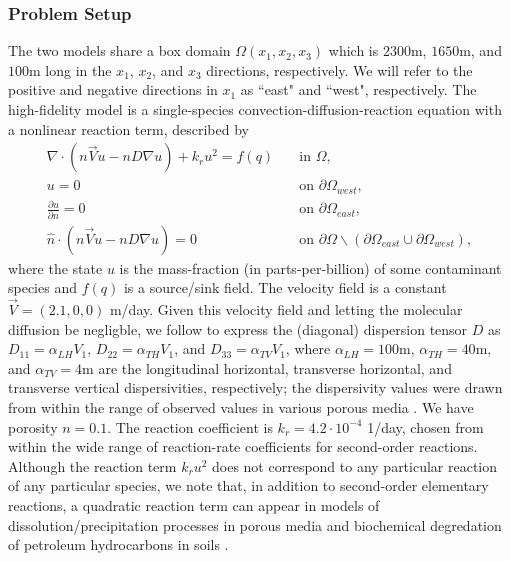 \subsubsection{Problem Setup} \label{sec:setup3D_diffmesh}

The two models share a box domain $\Omega(x_1,x_2,x_3)$ which is $2300$m, $1650$m, and $100$m long in the $x_1$, $x_2$, and $x_3$ directions, respectively. We will refer to the positive and negative directions in $x_1$ as ``east" and ``west", respectively. The high-fidelity model is a single-species convection-diffusion-reaction equation with a nonlinear reaction term, described by
%
\begin{subequations}
\label{eq:cdvcdrHF3D}
\begin{align}
\nabla\cdot(n\vec{V}u - nD\nabla u) + k_ru^2 = f(q) \quad &\text{in } \Omega, \label{eq:HFeq3D}\\
u = 0 \quad &\text{on } \partial \Omega_{west}, \\
\frac{\partial u}{\partial n} = 0 \quad &\text{on }\partial\Omega_{east}, \\
\hat{n}\cdot(n\vec{V}u - nD\nabla u) = 0 \quad &\text{on }\partial\Omega\backslash(\partial\Omega_{east}\cup\partial\Omega_{west}),
\end{align}
\end{subequations}
%
where the state $u$ is the mass-fraction (in parts-per-billion) of some contaminant species and $f(q)$ is a source/sink field. The velocity field is a constant $\vec{V}=(2.1,0,0)$ m/day. Given this velocity field and letting the molecular diffusion be negligble, we follow \cite{Vestedetal93} to express the (diagonal) dispersion tensor $D$ as $D_{11}=\alpha_{LH}V_1$, $D_{22}=\alpha_{TH}V_1$, and $D_{33}=\alpha_{TV}V_1$, where $\alpha_{LH}=100$m, $\alpha_{TH}=40$m, and $\alpha_{TV}=4$m are the longitudinal horizontal, transverse horizontal, and transverse vertical dispersivities, respectively; the dispersivity values were drawn from within the range of observed values in various porous media \cite{Davis86}. We have porosity $n=0.1$. The reaction coefficient is $k_r=4.2\cdot10^{-4}$ 1/day, chosen from within the wide range of reaction-rate coefficients for second-order reactions. Although the reaction term $k_ru^2$ does not correspond to any particular reaction of any particular species, we note that, in addition to second-order elementary reactions, a quadratic reaction term can appear in models of dissolution/precipitation processes in porous media \cite{Aha97} and biochemical degredation of petroleum hydrocarbons in soils \cite{Jack94}.

